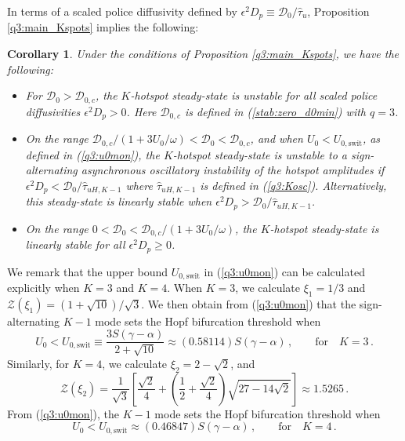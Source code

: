 \documentclass{article}%
\newtheorem{cor}[theorem]{Corollary}
\begin{document}
\noindent In terms of a scaled police diffusivity defined by 
$\epsilon^2 D_p\equiv {{\mathcal D}_0/\hat{\tau}_u}$, Proposition
\ref{q3:main_Kspots} implies the following:

\begin{cor}\label{q3:main_Kspots_pol} Under the conditions of
Proposition \ref{q3:main_Kspots}, we have the following:
\begin{itemize}
  \item For ${\mathcal D}_0>{\mathcal D}_{0,c}$, the $K$-hotspot
    steady-state is unstable for all scaled police diffusivities $\epsilon^2
    D_p>0$. Here ${\mathcal D}_{0,c}$ is defined in
   (\ref{stab:zero_d0min}) with $q=3$.
 \item On the range ${{\mathcal D}_{0,c}/\left(1+{3U_0/\omega}\right)}
   < {\mathcal D}_0 <{\mathcal D}_{0,c}$, and when $U_0<U_{0,\textrm{swit}}$,
   as defined in (\ref{q3:u0mon}), the $K$-hotspot steady-state is 
  unstable to a sign-alternating asynchronous oscillatory instability
   of the hotspot amplitudes if $\epsilon^2 D_p<{{\mathcal
       D}_{0}/\hat{\tau}_{uH,K-1}}$ where $\hat{\tau}_{uH,K-1}$ is defined in
  (\ref{q3:Kosc}). Alternatively, this steady-state is linearly
   stable when $\epsilon^2 D_p>{{\mathcal
       D}_{0}/\hat{\tau}_{uH,K-1}}$.
\item On the range $0<{\mathcal D}_0 < {{\mathcal
    D}_{0,c}/\left(1+{3U_0/\omega}\right)}$, the $K$-hotspot
  steady-state is linearly stable for all $\epsilon^2 D_p\geq 0$.
\end{itemize}
\end{cor}

We remark that the upper bound $U_{0,\textrm{swit}}$ in
(\ref{q3:u0mon}) can be calculated explicitly when $K=3$ and
$K=4$. When $K=3$, we calculate $\xi_1={1/3}$ and ${\mathcal
  Z}(\xi_1)={\left(1+\sqrt{10}\right)/\sqrt{3}}$.  We then obtain from
(\ref{q3:u0mon}) that the sign-alternating $K-1$ mode sets the Hopf
bifurcation threshold when
\begin{equation}\label{q3:U_0swit_3}
    U_0< U_{0,\textrm{swit}} \equiv \frac{3 S(\gamma-\alpha)}{2+\sqrt{10}} \approx
   (0.58114) S(\gamma-\alpha) \,, \qquad \mbox{for} \quad K=3 \,.
\end{equation}
Similarly, for $K=4$, we calculate $\xi_2=2-\sqrt{2}$, and 
\begin{equation*}
   {\mathcal Z}(\xi_2) =\frac{1}{\sqrt{3}}\left[ \frac{\sqrt{2}}{4} +
     \left( \frac{1}{2} + \frac{\sqrt{2}}{4} \right) \sqrt{27 -
       14\sqrt{2}}\right] \approx 1.5265 \,.
\end{equation*}
From (\ref{q3:u0mon}), the $K-1$ mode sets the Hopf bifurcation threshold when
\begin{equation}\label{q3:U_0swit_4}
    U_0< U_{0,\textrm{swit}} \approx (0.46847) S(\gamma-\alpha) \,, \qquad 
\mbox{for} \quad K=4 \,.
\end{equation}
\end{document}
